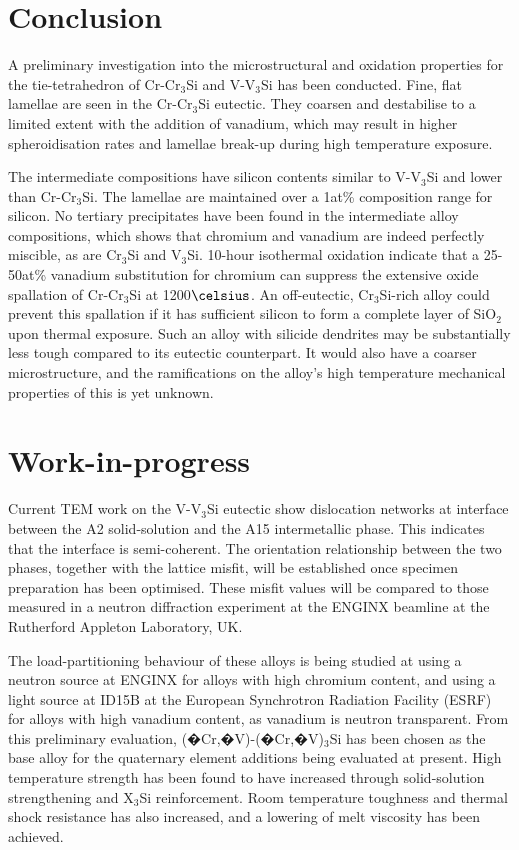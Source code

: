 \documentclass[preprint]{elsarticle}
\begin{document}
\section{Conclusion}

A preliminary investigation into the microstructural and oxidation properties for the tie-tetrahedron of Cr-Cr$_3$Si and V-V$_3$Si has been conducted. 
Fine, flat lamellae are seen in the Cr-Cr$_3$Si eutectic. They coarsen and destabilise to a limited extent with the addition of vanadium, which may result in higher spheroidisation rates and lamellae break-up during high temperature exposure.

The intermediate compositions have silicon contents similar to V-V$_3$Si and lower than Cr-Cr$_3$Si. The lamellae are maintained over a 1at\% composition range for silicon. No tertiary precipitates have been found in the intermediate alloy compositions, which shows that chromium and vanadium are indeed perfectly miscible, as are Cr$_3$Si and V$_3$Si. 
10-hour isothermal oxidation indicate that a 25-50at\% vanadium substitution for chromium can suppress the extensive oxide spallation of Cr-Cr$_3$Si at 1200$\celsius$. An off-eutectic, Cr$_3$Si-rich alloy could prevent this spallation if it has sufficient silicon to form a complete layer of SiO$_2$ upon thermal exposure. Such an alloy with silicide dendrites may be substantially less tough compared to its eutectic counterpart. It would also have a coarser microstructure, and the ramifications on the alloy's high temperature mechanical properties of this is yet unknown.  


\section{Work-in-progress}

Current TEM work on the V-V$_3$Si eutectic show dislocation networks at interface between the A2 solid-solution and the A15 intermetallic phase. This indicates that the interface is semi-coherent. The orientation relationship between the two phases, together with the lattice misfit, will be established once specimen preparation has been optimised. These misfit values will be compared to those measured in a neutron diffraction experiment at the ENGINX beamline at the Rutherford Appleton Laboratory, UK. 

The load-partitioning behaviour of these alloys is being studied at using a neutron source at ENGINX for alloys with high chromium content, and using a light source at ID15B at the European Synchrotron Radiation Facility (ESRF) for alloys with high vanadium content, as vanadium is neutron transparent.
From this preliminary evaluation, (�Cr,�V)-(�Cr,�V)$_3$Si has been chosen as the base alloy for the quaternary element additions being evaluated at present. High temperature strength has been found to have increased through solid-solution strengthening and X$_3$Si reinforcement. Room temperature toughness and thermal shock resistance has also increased, and a lowering of melt viscosity has been achieved.
\end{document}
